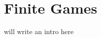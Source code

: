 
\chapter{Finite Games}\label{chapter:finiteGames}

will write an intro here

\begin{comment}
    \begin{itemize}
    \item high level description of an finite game
    \item structure of this chapter
    \item tell that we first define the more general version of a \textit{contiuous} game an then mixed extensions
    \item mention that payoffs are maximized
    
    \item In its most basic form, a “game” is a mathematical framework for modeling strategic interactions between optimizing agents with different individual objectives – the players of the game. Of course, there is an extensive taxonomy of game-theoretic models depending on the type of players involved (e.g., atomic vs. non-atomic), the nature of the players’ interactions (whether they are sequential or simultaneous, cooperative or non-cooperative), and/or the way these interactions determine the agents’ rewards. However, there are three principal components that are present throughout this diverse landscape: i) the players of the game; ii) each player’s set of actions; and iii) the players’ payoff functions. Specifying these three elements goes a long way in defining the relevant solution concepts and what may or may not be learnable in this context \cite{HDRmertikopoulos} p. 25
    
    \item We are thus led to the following fundamental question: if all players of a repeated game employ a no-regret updating policy, do their actions converge to a Nash equilibrium of the underlying game? In general, the answer to this question is a resounding “no”. Even in simple, finite games, no-regret learning may cycle [27] and its limit set may contain highly non- rationalizable strategies that assign positive weight only to strictly dominated strategies [48]. As such, our aim in this paper is twofold \cite{mertikopoulos} p.466
    
\end{itemize}
\end{comment}

